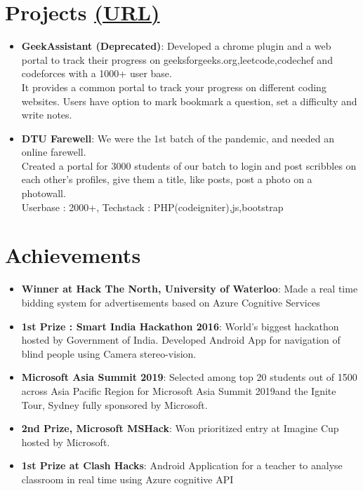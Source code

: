 \documentclass[letterpaper,11pt]{article}
\newcommand{\resumeItem}[2]{
  \item\small{
    \textbf{#1}{: #2 \vspace{-2pt}}
  }
}
\newcommand{\resumeSubItem}[2]{\resumeItem{#1}{#2}\vspace{-6pt}}
\newcommand{\resumeSubHeadingListStart}{\begin{itemize}[leftmargin=*]}
\newcommand{\resumeSubHeadingListEnd}{\end{itemize}}
\begin{document}
\section{Projects    \href{https://ronaksakhuja.github.io/projects.html}{(URL)}}
  \resumeSubHeadingListStart
    \resumeSubItem{GeekAssistant (Deprecated)}
      {Developed a chrome plugin and a web portal to track their progress on geeksforgeeks.org,leetcode,codechef and codeforces with a 1000+ user base.}
      \\[0.8em]\textbullet
      {It provides a common portal to track your progress on different coding websites. Users have option to mark bookmark a question, set a difficulty and write notes.}
    \resumeSubItem{DTU Farewell}
      {We were the 1st batch of the pandemic, and needed an online farewell.}
      \\[0.8em]\textbullet
      { Created a portal for 3000 students of our batch to login and post scribbles on each other's profiles, give them a title, like posts, post a photo on a photowall.}
      \\[0em]\textbullet
      { Userbase : 2000+, Techstack : PHP(codeigniter),js,bootstrap}
  \resumeSubHeadingListEnd

\section{Achievements}
    \resumeSubHeadingListStart
    \resumeSubItem
    {Winner at Hack The North, University of Waterloo}
    {Made a real time bidding system for advertisements based on Azure Cognitive Services}
    \resumeSubItem
    {1st Prize : Smart India Hackathon 2016}
    {World's biggest hackathon hosted by Government of India. Developed Android App for navigation of blind people using Camera stereo-vision.}
    \resumeSubItem
    {Microsoft Asia Summit 2019}
    {Selected among top 20 students out of 1500 across Asia Pacific Region for Microsoft Asia Summit 2019and the Ignite Tour, Sydney fully sponsored by Microsoft.}
    \resumeSubItem
    {2nd Prize, Microsoft MSHack}
    { Won prioritized entry at Imagine Cup hosted by Microsoft.}
    \resumeSubItem
    {1st Prize at Clash Hacks}
    {Android Application for a teacher to analyse classroom in real time using Azure cognitive API}
    \resumeSubHeadingListEnd
\end{document}
